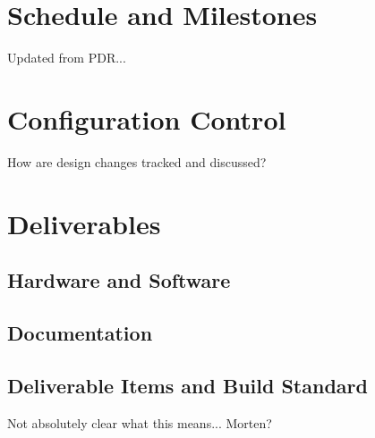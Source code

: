\section{Schedule and Milestones}

Updated from PDR...

\section{Configuration Control}

How are design changes tracked and discussed?

\section{Deliverables}

\subsection{Hardware and Software}

\subsection{Documentation}

\subsection{Deliverable Items and Build Standard}

Not absolutely clear what this means... Morten?